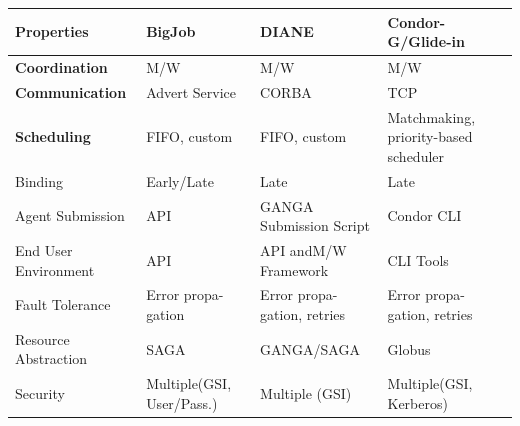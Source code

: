 \documentclass[conference]{IEEEtran}
\begin{document}
\begin{table}[t]
\footnotesize
\centering
\begin{tabular}{|p{1.9cm}|p{1.7cm}|p{1.6cm}|p{1.6cm}|}
	\hline
	\textbf{Properties}
	&\textbf{BigJob} &\textbf{DIANE} &\textbf{Condor-G/\newline Glide-in}    
	\\ \hline

\textbf{Coordination} &M/W  &M/W &M/W \\ \hline
	
\textbf{Communication} &Advert Service &CORBA &TCP\\ \hline

\textbf{Scheduling} &FIFO, custom &FIFO, custom &Matchmaking, priority-based scheduler \\

\hfill Binding & Early/Late &\hfill Late &\hfill Late \\


\hline
Agent Submission &API &GANGA Submission Script &Condor CLI 
\\

\hline

End User Environment &API &API and\newline M/W Framework  &CLI Tools \\ 

\hline

Fault Tolerance &Error propa-\newline gation &Error propa-\newline gation, retries &Error propa-\newline gation, retries \\

\hline

Resource Abstraction &SAGA &GANGA/\newline SAGA &Globus \\ 

\hline

Security &Multiple\newline (GSI, User/Pass.) &Multiple (GSI) &Multiple\newline (GSI, 
Kerberos) \\ 

\hline



\end{tabular}
\end{table}
\end{document}
